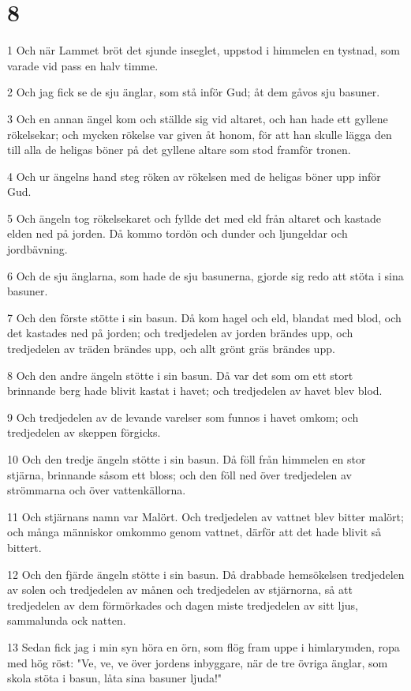 \chapter{8}

\par 1 Och när Lammet bröt det sjunde inseglet, uppstod i himmelen en tystnad, som varade vid pass en halv timme.
\par 2 Och jag fick se de sju änglar, som stå inför Gud; åt dem gåvos sju basuner.
\par 3 Och en annan ängel kom och ställde sig vid altaret, och han hade ett gyllene rökelsekar; och mycken rökelse var given åt honom, för att han skulle lägga den till alla de heligas böner på det gyllene altare som stod framför tronen.
\par 4 Och ur ängelns hand steg röken av rökelsen med de heligas böner upp inför Gud.
\par 5 Och ängeln tog rökelsekaret och fyllde det med eld från altaret och kastade elden ned på jorden. Då kommo tordön och dunder och ljungeldar och jordbävning.
\par 6 Och de sju änglarna, som hade de sju basunerna, gjorde sig redo att stöta i sina basuner.
\par 7 Och den förste stötte i sin basun. Då kom hagel och eld, blandat med blod, och det kastades ned på jorden; och tredjedelen av jorden brändes upp, och tredjedelen av träden brändes upp, och allt grönt gräs brändes upp.
\par 8 Och den andre ängeln stötte i sin basun. Då var det som om ett stort brinnande berg hade blivit kastat i havet; och tredjedelen av havet blev blod.
\par 9 Och tredjedelen av de levande varelser som funnos i havet omkom; och tredjedelen av skeppen förgicks.
\par 10 Och den tredje ängeln stötte i sin basun. Då föll från himmelen en stor stjärna, brinnande såsom ett bloss; och den föll ned över tredjedelen av strömmarna och över vattenkällorna.
\par 11 Och stjärnans namn var Malört. Och tredjedelen av vattnet blev bitter malört; och många människor omkommo genom vattnet, därför att det hade blivit så bittert.
\par 12 Och den fjärde ängeln stötte i sin basun. Då drabbade hemsökelsen tredjedelen av solen och tredjedelen av månen och tredjedelen av stjärnorna, så att tredjedelen av dem förmörkades och dagen miste tredjedelen av sitt ljus, sammalunda ock natten.
\par 13 Sedan fick jag i min syn höra en örn, som flög fram uppe i himlarymden, ropa med hög röst: "Ve, ve, ve över jordens inbyggare, när de tre övriga änglar, som skola stöta i basun, låta sina basuner ljuda!"

